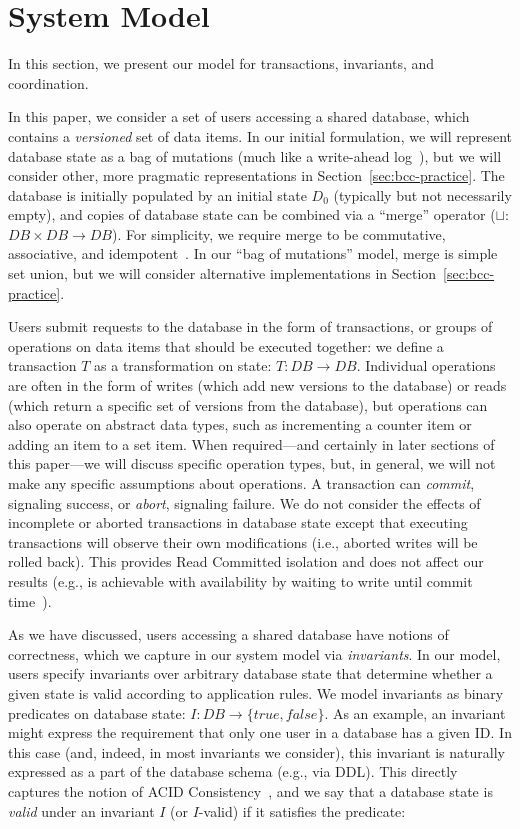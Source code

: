 
\section{System Model}
\label{sec:model}

In this section, we present our model for transactions, invariants,
and coordination.

 In this paper, we consider a set of users
accessing a shared database, which contains a \textit{versioned} set
of data items. In our initial formulation, we will represent database
state as a bag of mutations (much like a write-ahead
log~\cite{gray-book}), but we will consider other, more pragmatic
representations in Section~\ref{sec:bcc-practice}. The database is
initially populated by an initial state $D_0$ (typically but not
necessarily empty), and copies of database state can be combined via a
``merge'' operator ($\sqcup$: $DB \times DB \rightarrow DB$).  For
simplicity, we require merge to be commutative, associative, and
idempotent~\cite{calm,crdt}. In our ``bag of mutations'' model, merge
is simple set union, but we will consider alternative implementations
in Section~\ref{sec:bcc-practice}.

 Users submit requests to the database in the
form of transactions, or groups of operations on data items that
should be executed together: we define a transaction $T$ as a
transformation on state: $T: DB \rightarrow DB$. Individual operations
are often in the form of writes (which add new versions to the
database) or reads (which return a specific set of versions from the
database), but operations can also operate on abstract data types,
such as incrementing a counter item or adding an item to a set
item. When required---and certainly in later sections of this
paper---we will discuss specific operation types, but, in general, we
will not make any specific assumptions about operations. A transaction
can \textit{commit}, signaling success, or \textit{abort}, signaling
failure. We do not consider the effects of incomplete or aborted
transactions in database state except that executing transactions will
observe their own modifications (i.e., aborted writes will be rolled
back). This provides Read Committed isolation and does not affect our
results (e.g., is achievable with availability by waiting to write
until commit time~\cite{hat-vldb,spanner}).

 As we have discussed, users accessing a shared
database have notions of correctness, which we capture in our system
model via \textit{invariants}. In our model, users specify invariants
over arbitrary database state that determine whether a given state is
valid according to application rules. We model invariants as binary
predicates on database state: $I: DB \rightarrow \{true, false\}$.  As
an example, an invariant might express the requirement that only one
user in a database has a given ID. In this case (and, indeed, in most
invariants we consider), this invariant is naturally expressed as a
part of the database schema (e.g., via DDL). This directly captures
the notion of ACID Consistency~\cite{bernstein-book,gray-virtues}, and
we say that a database state is \textit{valid} under an invariant $I$
(or $I$-valid) if it satisfies the predicate:

